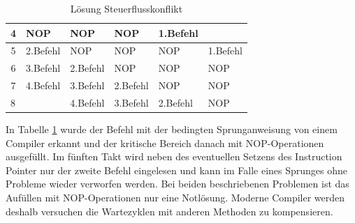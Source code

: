 \documentclass[12pt]{article}
\begin{document}
\begin{table}[!htb]
\begin{tabular}{|c|l|l|l|l|l|}
4                       & \cellcolor[HTML]{F8A102}NOP                                                             & \cellcolor[HTML]{F8A102}NOP                                                                & \cellcolor[HTML]{F8A102}NOP                                                                 & \cellcolor[HTML]{9698ED}1.Befehl        &                                                                                               \\ \hline
5                       & \cellcolor[HTML]{38FFF8}2.Befehl                                                        & \cellcolor[HTML]{F8A102}NOP                                                                & \cellcolor[HTML]{F8A102}NOP                                                                 & \cellcolor[HTML]{F8A102}NOP             & \cellcolor[HTML]{9698ED}1.Befehl                                                              \\ \hline
6                       & \cellcolor[HTML]{67FD9A}3.Befehl                                                        & \cellcolor[HTML]{38FFF8}2.Befehl                                                           & \cellcolor[HTML]{F8A102}NOP                                                                 & \cellcolor[HTML]{F8A102}NOP             & \cellcolor[HTML]{F8A102}NOP                                                                   \\ \hline
7                       & \cellcolor[HTML]{FFFE65}4.Befehl                                                        & \cellcolor[HTML]{67FD9A}3.Befehl                                                           & \cellcolor[HTML]{38FFF8}2.Befehl                                                            & \cellcolor[HTML]{F8A102}NOP             & \cellcolor[HTML]{F8A102}NOP                                                                   \\ \hline
\multicolumn{1}{|l|}{8} &                                                                                         & \cellcolor[HTML]{FFFE65}4.Befehl                                                           & \cellcolor[HTML]{67FD9A}3.Befehl                                                            & \cellcolor[HTML]{38FFF8}2.Befehl        & \cellcolor[HTML]{F8A102}NOP                                                                   \\ \hline
\end{tabular}
\caption{Lösung Steuerflusskonflikt}
\label{tab:loesungSteuerflusskonflikt}
\end{table}
\noindent In Tabelle
 \ref{tab:loesungSteuerflusskonflikt} wurde der Befehl mit der bedingten Sprunganweisung von einem Compiler erkannt und der kritische Bereich danach mit NOP-Operationen ausgefüllt. Im fünften Takt wird neben des eventuellen Setzens des Instruction Pointer nur der zweite Befehl eingelesen und kann im Falle eines Sprunges ohne Probleme wieder verworfen werden. Bei beiden beschriebenen Problemen ist das Aufüllen mit NOP-Operationen nur eine Notlösung. Moderne Compiler werden deshalb versuchen die Wartezyklen mit anderen Methoden zu kompensieren.
\end{document}
